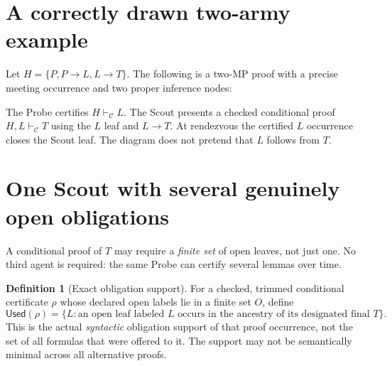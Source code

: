 \documentclass[11pt,letterpaper]{article}
\theoremstyle{definition}
\newtheorem{definition}[theorem]{Definition}
\newcommand{\vdC}{\vdash_{\mathcal C}}
\newcommand{\Used}{\mathsf{Used}}
\begin{document}
\section{A correctly drawn two-army example}
Let $H=\{P,P\to L,L\to T\}$. The following is a two-MP proof with a
precise meeting occurrence and two proper inference nodes:
\begin{center}
\end{center}
The Probe certifies $H\vdC L$. The Scout presents a checked conditional
proof $H,L\vdC T$ using the $L$ leaf and $L\to T$. At rendezvous the
certified $L$ occurrence closes the Scout leaf. The diagram does not
pretend that $L$ follows from $T$.

\section{One Scout with several genuinely open obligations}
A conditional proof of $T$ may require a \emph{finite set} of open leaves,
not just one. No third agent is required: the same Probe can certify
several lemmas over time.

\begin{definition}[Exact obligation support]
For a checked, trimmed conditional certificate $\rho$ whose declared
open labels lie in a finite set $O$, define
\[
 \Used(\rho)=\{L:\text{an open leaf labeled $L$ occurs in the
 ancestry of its designated final $T$}\}.
\]
This is the actual \emph{syntactic} obligation support of that proof
occurrence, not the set of all formulas that were offered to it. The
support may not be semantically minimal across all alternative proofs.
\end{definition}
\end{document}
